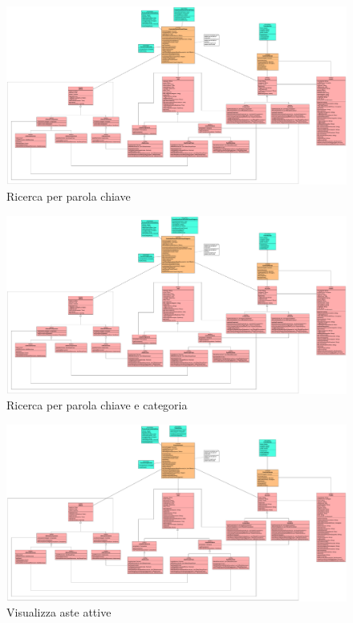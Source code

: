         \begin{figure}[htbp!]
            \centering
                \includegraphics[width=1\linewidth]{Immagini/Diagrammi/Class Diagram/Analisi/Utente generico/RicercaParolaChiave.pdf}
            \caption{Ricerca per parola chiave}
        \end{figure}
        
        \begin{figure}[htbp!]
            \centering
                \includegraphics[width=1\linewidth]{Immagini/Diagrammi/Class Diagram/Analisi/Utente generico/RicercaParolaChiaveCategoria.pdf}
            \caption{Ricerca per parola chiave e categoria}
        \end{figure}
        
        \begin{figure}[htbp!]
            \centering
                \includegraphics[width=1\linewidth]{Immagini/Diagrammi/Class Diagram/Analisi/Utente generico/VisualizzaAsteAttive.pdf}
            \caption{Visualizza aste attive}
        \end{figure}
        
